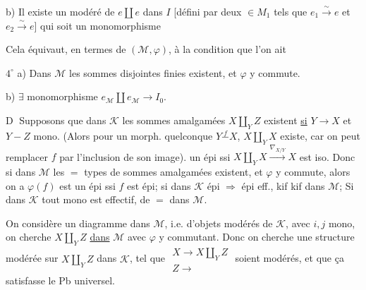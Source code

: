 b) Il existe un  modéré de  $e\amalg e$ dans $I$ [défini par deux  $\in M_1$ tels que $e_1\overset{\sim}{\to}e$ et $e_2\overset{\sim}{\to}e$] qui soit un monomorphisme


Cela équivaut, en termes de $(\mathcal M,\varphi)$, à la condition que l'on ait

$4^\circ$ a) Dans $\mathcal M$ les sommes disjointes finies existent, et $\varphi$ y commute.

b) $\exists$ monomorphisme $e_{\mathcal M}\amalg e_{\mathcal M}\longrightarrow I_0$.

\textcircled{D} Supposons que dans $\mathcal K$ les sommes amalgamées $X\amalg_Y Z$ existent \uline{si} $Y\to X$ et $Y-Z$ mono.
(Alors pour un morph. quelconque $Y\mathrel{\overset{f}{-}}X$, $X\amalg_Y X$ existe, car on peut remplacer $f$ par l'inclusion de son image).
un épi ssi $X\amalg_Y X\xrightarrow{\nabla_{X/Y}}X$ est iso. Donc si dans $\mathcal M$ les $=$ types de sommes amalgamées existent, et $\varphi$ y commute, alors on a $\varphi(f)$ est un épi ssi $f$ est épi; si dans $\mathcal K$ épi $\Rightarrow$ épi eff., kif kif dans $\mathcal M$; Si dans $\mathcal K$ tout mono est effectif, de $=$ dans $\mathcal M$.

On considère un diagramme dans $\mathcal M$, i.e. d'objets modérés de $\mathcal K$, 
avec $i,j$ mono, on cherche $X\amalg_Y Z$ \uline{dans} $\mathcal M$ avec $\varphi$ y commutant.
Donc on cherche une structure modérée sur $X\amalg_Y Z$ dans $\mathcal K$,  tel que
$\begin{array}{c}X\longrightarrow X\amalg_Y Z\\ Z\longrightarrow\end{array}$
soient modérés, et que ça satisfasse le Pb universel.


